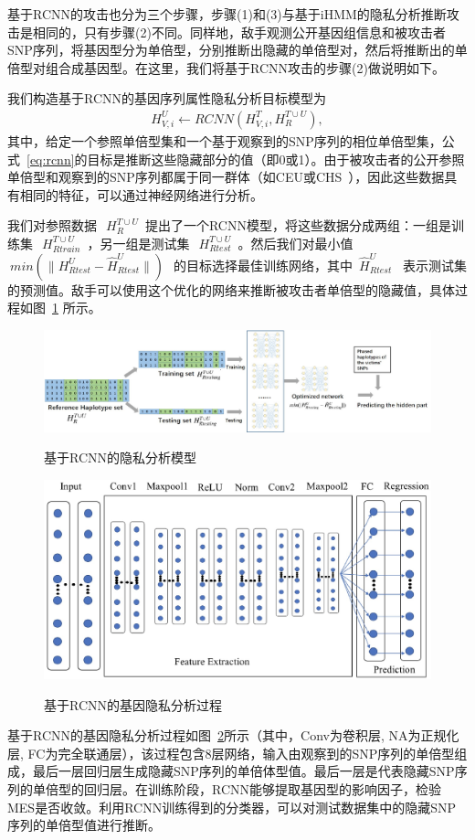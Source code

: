 基于RCNN的攻击也分为三个步骤，步骤(1)和(3)与基于iHMM的隐私分析推断攻击是相同的，只有步骤(2)不同。同样地，敌手观测公开基因组信息和被攻击者SNP序列，将基因型分为单倍型，分别推断出隐藏的单倍型对，然后将推断出的单倍型对组合成基因型。在这里，我们将基于RCNN攻击的步骤(2)做说明如下。

我们构造基于RCNN的基因序列属性隐私分析目标模型为
\begin{align}\label{eq:rcnn}
H_{V,i}^U  \leftarrow RCNN(H_{V,i}^T, H_R^{T \cup U}),
\end{align}
其中，给定一个参照单倍型集和一个基于观察到的SNP序列的相位单倍型集，公式~\ref{eq:rcnn}的目标是推断这些隐藏部分的值（即0或1）。由于被攻击者的公开参照单倍型和观察到的SNP序列都属于同一群体（如CEU或CHS~\cite{igsr2015which}），因此这些数据具有相同的特征，可以通过神经网络进行分析。

我们对参照数据~$~H_R^{T \cup U}$~提出了一个RCNN模型，将这些数据分成两组：一组是训练集~$~H_{Rtrain}^{T \cup U}$~，另一组是测试集~$~H_{Rtest}^{T \cup U}$~。然后我们对最小值~$~min(\|H_{Rtest}^{ U} - \hat{H}_{Rtest}^{U}\|)~$~的目标选择最佳训练网络，其中~$\hat{H}_{Rtest}^{U}$~ 表示测试集的预测值。敌手可以使用这个优化的网络来推断被攻击者单倍型的隐藏值，具体过程如图~\ref{fig:rcnn_infer} 所示。

\begin{figure}[htbp]
	\centering
	\includegraphics[width=0.95\linewidth]{./figures/Fig3-RCNN-inference-attack.eps}\\
	\caption{基于RCNN的隐私分析模型}
	\label{fig:rcnn_infer}
\end{figure}


\begin{figure}[htbp]
	\centering
	\includegraphics[width=0.7\linewidth]{./figures/Fig4-RCNN-structure.eps}\\
	\caption{基于RCNN的基因隐私分析过程}
	\label{fig:RCNN}
\end{figure}
基于RCNN的基因隐私分析过程如图~\ref{fig:RCNN}所示（其中，Conv为卷积层, NA为正规化层, FC为完全联通层），该过程包含8层网络，输入由观察到的SNP序列的单倍型组成，最后一层回归层生成隐藏SNP序列的单倍体型值。最后一层是代表隐藏SNP序列的单倍型的回归层。在训练阶段，RCNN能够提取基因型的影响因子，检验MES是否收敛。利用RCNN训练得到的分类器，可以对测试数据集中的隐藏SNP序列的单倍型值进行推断。

